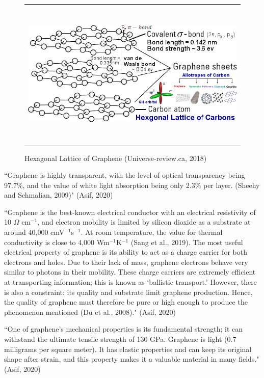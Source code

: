 \documentclass[a4paper,12pt]{article}
\numberwithin{equation}{section}
\numberwithin{figure}{section}
\begin{document}
\begin{figure}[H]
  \centering
  \begin{tabular}{@{}c@{}}
    \includegraphics[width=.75\linewidth,height=200pt]{Figures/Figure2.1.jpg} \\
  \end{tabular}
  \caption{Hexagonal Lattice of Graphene (Universe-review.ca, 2018)}
\end{figure}

\noindent ``Graphene is highly transparent, with the level of optical transparency being 97.7\%, and the value of white light absorption being only 2.3\% per layer. (Sheehy and Schmalian, 2009)" (Asif, 2020)\vspace{\baselineskip}

\noindent ``Graphene is the best-known electrical conductor with an electrical resistivity of 10 $\Omega$ cm$^{-1}$, and electron mobility is limited by silicon dioxide as a substrate at around 40,000 cmV$^{-1}$s$^{-1}$. At room temperature, the value for thermal conductivity is close to 4,000 Wm$^{-1}$K$^{-1}$ (Sang et al., 2019). The most useful electrical property of graphene is its ability to act as a charge carrier for both electrons and holes. Due to their lack of mass, graphene electrons behave very similar to photons in their mobility. These charge carriers are extremely efficient at transporting information; this is known as ‘ballistic transport.’ However, there is also a constraint: its quality and substrate limit graphene production. Hence, the quality of graphene must therefore be pure or high enough to produce the phenomenon mentioned (Du et al., 2008)." (Asif, 2020)\vspace{\baselineskip}

\noindent ``One of graphene's mechanical properties is its fundamental strength; it can withstand the ultimate tensile strength of 130 GPa. Graphene is light (0.7 milligrams per square meter). It has elastic properties and can keep its original shape after strain, and this property makes it a valuable material in many fields." (Asif, 2020)
\end{document}
